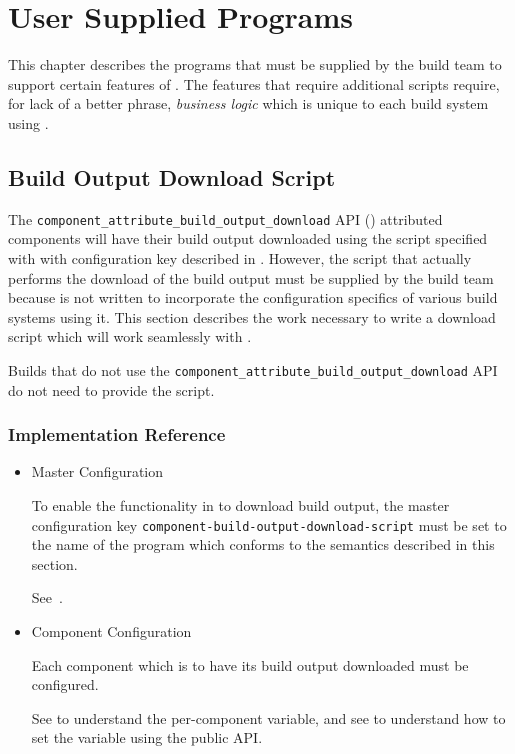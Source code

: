 \chapter{User Supplied Programs}

This chapter describes the programs that must be supplied by the build
team to support certain features of \lmsbw.  The \lmsbw features that
require additional scripts require, for lack of a better phrase,
\emph{business logic} which is unique to each build system using
\lmsbw.


\section{Build Output Download Script}\label{api:build-output-download-script}

The \texttt{component\_attribute\_build\_output\_download} API
() attributed components will have
their build output downloaded using the script specified with with
configuration key described in
.  However, the
script that actually performs the download of the build output must be
supplied by the build team because \lmsbw is not written to
incorporate the configuration specifics of various build systems using
it.  This section describes the work necessary to write a download
script which will work seamlessly with \lmsbw.

Builds that do not use the
\texttt{component\_attribute\_build\_output\_download} API do not need
to provide the script.

\subsection{Implementation Reference}

\begin{itemize}
  \item{Master Configuration}

    To enable the functionality in \lmsbw to download build output,
    the master configuration key
    \texttt{component-build-output-download-script} must be set to the
    name of the program which conforms to the semantics described in
    this section.

    See~.

  \item{Component Configuration}

    Each component which is to have its build output downloaded must
    be configured.

    See  to understand the
    per-component variable, and see 
    to understand how to set the variable using the public API.
\end{itemize}

